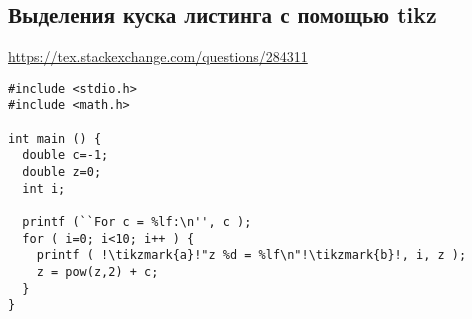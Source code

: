 \subsection{Выделения куска листинга с помощью tikz}
\url{https://tex.stackexchange.com/questions/284311}

\begin{lstlisting}[escapechar=!,basicstyle=\ttfamily]
#include <stdio.h>
#include <math.h>

int main () {
  double c=-1;
  double z=0;
  int i;

  printf (``For c = %lf:\n'', c );
  for ( i=0; i<10; i++ ) {
    printf ( !\tikzmark{a}!"z %d = %lf\n"!\tikzmark{b}!, i, z );
    z = pow(z,2) + c;
  }
}
\end{lstlisting}

